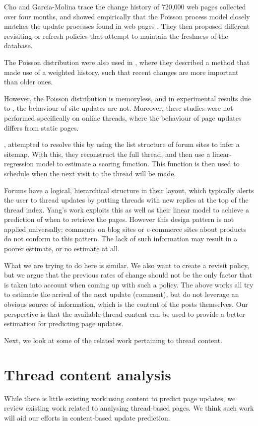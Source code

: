 Cho and Garcia-Molina trace the change history of 720,000 web pages collected 
over four months, and showed empirically that the Poisson process model closely 
matches the update processes found in web pages \cite{Cho1999}. They then 
proposed different revisiting or refresh policies 
\cite{Cho2003,Garcia-molina2003} that attempt to maintain the freshness of the 
database.

The Poisson distribution were also used in , where they 
described a method that made use of a weighted history, such that recent changes 
are more important than older ones. 

However, the Poisson distribution is memoryless, and in experimental results due 
to , the behaviour of site updates are not. Moreover, these 
studies were not performed specifically on online threads, where the behaviour 
of page updates differs from static pages.

, attempted to resolve this by using the list structure of 
forum sites to infer a sitemap. With this, they reconstruct the full thread, and 
then use a linear-regression model to estimate a scoring function. This function 
is then used to schedule when the next visit to the thread will be made.  

Forums have a logical, hierarchical structure in their layout, which typically 
alerts the user to thread updates by putting threads with new replies at the top 
of the thread index. Yang's work exploits this as well as their linear model to 
achieve a prediction of when to retrieve the pages.  However this design pattern 
is not applied universally; comments on blog sites or e-commerce sites about 
products do not conform to this pattern.  The lack of such information may 
result in a poorer estimate, or no estimate at all.

What we are trying to do here is similar. We also want to create a revisit 
policy, but we argue that the previous rates of change should not be the only 
factor that is taken into account when coming up with such a policy. The above 
works all try to estimate the arrival of the next update (comment), but do not 
leverage an obvious source of information, which is the content of the posts 
themselves. Our perspective is that the available thread content can be used to 
provide a better estimation for predicting page updates. 

Next, we look at some of the related work pertaining to thread content.

\section{Thread content analysis}
While there is little existing work using content to predict page updates, we 
review existing work related to analysing thread-based pages. We think such work 
will aid our efforts in content-based update prediction.

